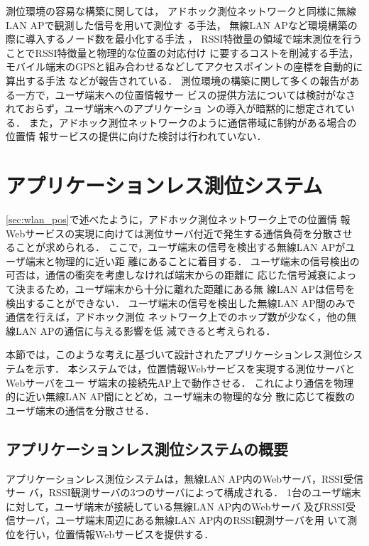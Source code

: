 \documentclass[technicalreport]{ieicej}
\begin{document}
測位環境の容易な構築に関しては，
アドホック測位ネットワークと同様に無線LAN APで観測した信号を用いて測位す
る手法\cite{ganu04:infra_loc_wlan}，
無線LAN APなど環境構築の際に導入するノード数を最小化する手法
\cite{krishnan04:lease}，
RSSI特徴量の領域で端末測位を行うことでRSSI特徴量と物理的な位置の対応付け
に要するコストを削減する手法\cite{yang12:locate_finger}，
モバイル端末のGPSと組み合わせるなどしてアクセスポイントの座標を自動的に
算出する手法
\cite{chintalapudi10:indoor_loc_nopain,lim10:zero-config_loc}
などが報告されている．
測位環境の構築に関して多くの報告がある一方で，ユーザ端末への位置情報サー
ビスの提供方法については検討がなされておらず，ユーザ端末へのアプリケーショ
ンの導入が暗黙的に想定されている．
また，アドホック測位ネットワークのように通信帯域に制約がある場合の位置情
報サービスの提供に向けた検討は行われていない．

\section{アプリケーションレス測位システム}
\label{sec:app-less}

\ref{sec:wlan_pos}で述べたように，アドホック測位ネットワーク上での位置情
報Webサービスの実現に向けては測位サーバ付近で発生する通信負荷を分散させ
ることが求められる．
ここで，ユーザ端末の信号を検出する無線LAN APがユーザ端末と物理的に近い距
離にあることに着目する．
ユーザ端末の信号検出の可否は，通信の衝突を考慮しなければ端末からの距離に
応じた信号減衰によって決まるため，ユーザ端末から十分に離れた距離にある無
線LAN APは信号を検出することができない．
ユーザ端末の信号を検出した無線LAN AP間のみで通信を行えば，アドホック測位
ネットワーク上でのホップ数が少なく，他の無線LAN APの通信に与える影響を低
減できると考えられる．

本節では，このような考えに基づいて設計されたアプリケーションレス測位シス
テムを示す．
本システムでは，位置情報Webサービスを実現する測位サーバとWebサーバをユー
ザ端末の接続先AP上で動作させる．
これにより通信を物理的に近い無線LAN AP間にとどめ，ユーザ端末の物理的な分
散に応じて複数のユーザ端末の通信を分散させる．

\subsection{アプリケーションレス測位システムの概要}

アプリケーションレス測位システムは，無線LAN AP内のWebサーバ，RSSI受信サー
バ，RSSI観測サーバの3つのサーバによって構成される．
1台のユーザ端末に対して，ユーザ端末が接続している無線LAN AP内のWebサーバ
及びRSSI受信サーバ，ユーザ端末周辺にある無線LAN AP内のRSSI観測サーバを用
いて測位を行い，位置情報Webサービスを提供する．
\end{document}
